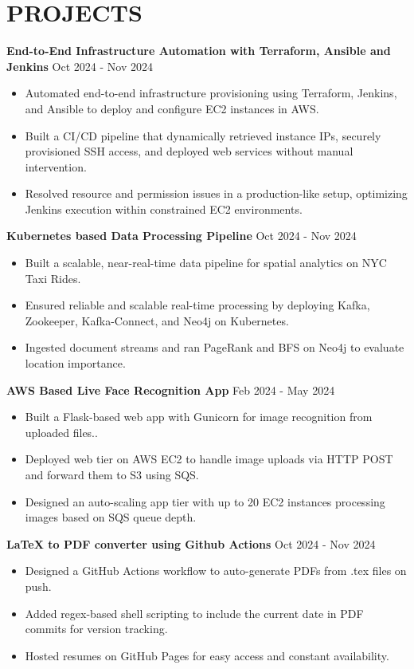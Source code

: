 \documentclass[a4paper,9pt]{extarticle}
\begin{document}
\section*{PROJECTS}

\textbf{End-to-End Infrastructure Automation with Terraform, Ansible and Jenkins} \hfill Oct 2024 - Nov 2024%
\begin{itemize}
    \item Automated end-to-end infrastructure provisioning using Terraform, Jenkins, and Ansible to deploy and configure EC2 instances in AWS.
    \item Built a CI/CD pipeline that dynamically retrieved instance IPs, securely provisioned SSH access, and deployed web services without manual intervention.
    \item Resolved resource and permission issues in a production-like setup, optimizing Jenkins execution within constrained EC2 environments.
\end{itemize}

\noindent
\textbf{Kubernetes based Data Processing Pipeline}  \hfill Oct 2024 - Nov 2024%
\begin{itemize}
    \item Built a scalable, near-real-time data pipeline for spatial analytics on NYC Taxi Rides.
    \item Ensured reliable and scalable real-time processing by deploying Kafka, Zookeeper, Kafka-Connect, and Neo4j on Kubernetes.
    \item Ingested document streams and ran PageRank and BFS on Neo4j to evaluate location importance.
    
\end{itemize}

\noindent
\textbf{AWS Based Live Face Recognition App}  \hfill Feb 2024 - May 2024 %
\begin{itemize}
    \item Built a Flask-based web app with Gunicorn for image recognition from uploaded files..
    \item Deployed web tier on AWS EC2 to handle image uploads via HTTP POST and forward them to S3 using SQS.
    \item Designed an auto-scaling app tier with up to 20 EC2 instances processing images based on SQS queue depth.

    
\end{itemize}

\noindent
\textbf{LaTeX to PDF converter using Github Actions} \hfill Oct 2024 - Nov 2024%
\begin{itemize}
    \item Designed a GitHub Actions workflow to auto-generate PDFs from .tex files on push.
    \item Added regex-based shell scripting to include the current date in PDF commits for version tracking.
    \item Hosted resumes on GitHub Pages for easy access and constant availability.
\end{itemize}

\end{document}
